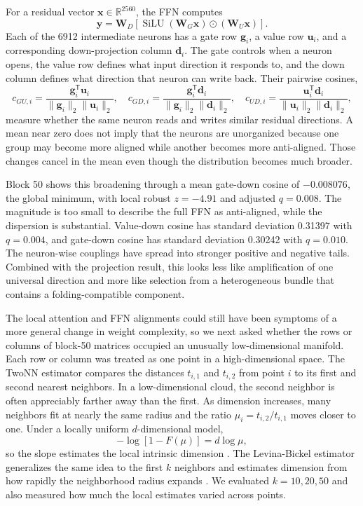 \documentclass[11pt]{article}
\newcommand{\R}{\mathbb{R}}
\newcommand{\mat}[1]{\mathbf{#1}}
\newcommand{\vect}[1]{\boldsymbol{#1}}
\begin{document}
For a residual vector $\vect{x}\in\R^{2560}$, the FFN computes
\begin{equation}
\vect{y}=\mat{W}_{D}\left[\operatorname{SiLU}(\mat{W}_{G}\vect{x})\odot(\mat{W}_{U}\vect{x})\right].
\label{eq:swiglu}
\end{equation}
Each of the 6912 intermediate neurons has a gate row $\vect{g}_i$, a value row $\vect{u}_i$, and a corresponding down-projection column $\vect{d}_i$. The gate controls when a neuron opens, the value row defines what input direction it responds to, and the down column defines what direction that neuron can write back. Their pairwise cosines,
\begin{equation}
c_{GU,i}=\frac{\vect{g}_i^{\mathsf T}\vect{u}_i}{\|\vect{g}_i\|_2\|\vect{u}_i\|_2},
\quad
c_{GD,i}=\frac{\vect{g}_i^{\mathsf T}\vect{d}_i}{\|\vect{g}_i\|_2\|\vect{d}_i\|_2},
\quad
c_{UD,i}=\frac{\vect{u}_i^{\mathsf T}\vect{d}_i}{\|\vect{u}_i\|_2\|\vect{d}_i\|_2},
\label{eq:ffncos}
\end{equation}
measure whether the same neuron reads and writes similar residual directions. A mean near zero does not imply that the neurons are unorganized because one group may become more aligned while another becomes more anti-aligned. Those changes cancel in the mean even though the distribution becomes much broader.

Block 50 shows this broadening through a mean gate-down cosine of $-0.008076$, the global minimum, with local robust $z=-4.91$ and adjusted $q=0.008$. The magnitude is too small to describe the full FFN as anti-aligned, while the dispersion is substantial. Value-down cosine has standard deviation 0.31397 with $q=0.004$, and gate-down cosine has standard deviation 0.30242 with $q=0.010$. The neuron-wise couplings have spread into stronger positive and negative tails. Combined with the projection result, this looks less like amplification of one universal direction and more like selection from a heterogeneous bundle that contains a folding-compatible component.

The local attention and FFN alignments could still have been symptoms of a more general change in weight complexity, so we next asked whether the rows or columns of block-50 matrices occupied an unusually low-dimensional manifold. Each row or column was treated as one point in a high-dimensional space. The TwoNN estimator compares the distances $t_{i,1}$ and $t_{i,2}$ from point $i$ to its first and second nearest neighbors. In a low-dimensional cloud, the second neighbor is often appreciably farther away than the first. As dimension increases, many neighbors fit at nearly the same radius and the ratio $\mu_i=t_{i,2}/t_{i,1}$ moves closer to one. Under a locally uniform $d$-dimensional model,
\begin{equation}
-\log\!\left[1-F(\mu)\right]=d\log\mu,
\end{equation}
so the slope estimates the local intrinsic dimension \cite{facco2017}. The Levina-Bickel estimator generalizes the same idea to the first $k$ neighbors and estimates dimension from how rapidly the neighborhood radius expands \cite{levina2004}. We evaluated $k=10,20,50$ and also measured how much the local estimates varied across points.
\end{document}
